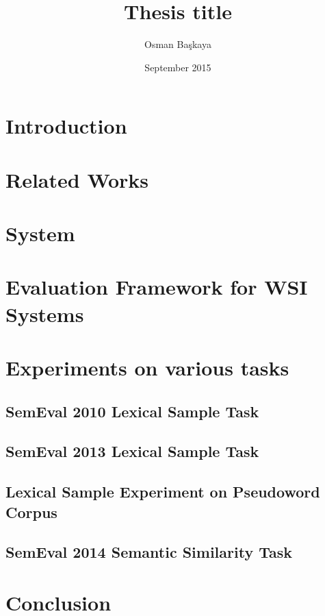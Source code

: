 \documentclass[a4paper, 12pt]{book}
\title{Thesis title}
\author{Osman Başkaya}
\date{September 2015}
\begin{document}
\maketitle




\tableofcontents

\chapter{Introduction}

\chapter{Related Works}

\chapter{System}


\chapter{Evaluation Framework for WSI Systems}


\chapter{Experiments on various tasks}
\section{SemEval 2010 Lexical Sample Task}\label{subsection:semeval10}

\section{SemEval 2013 Lexical Sample Task}\label{subsection:semeval13}

\section{Lexical Sample Experiment on Pseudoword Corpus}\label{subsection:pseudoset}
\section{SemEval 2014 Semantic Similarity Task}\label{section:sem-sim-task}

\chapter{Conclusion}


% 

% 
% 


%

\end{document}
